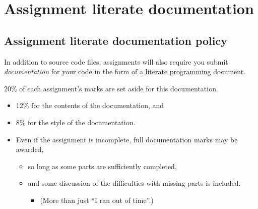 \documentclass[11pt]{article}
\begin{document}
\section{Assignment literate documentation}
\label{sec:orgacc7ec9}
\subsection{Assignment literate documentation policy}
\label{sec:org9ca13e1}
In addition to source code files,
assignments will also require you submit \emph{documentation} for your code
in the form of
a \href{http://www.literateprogramming.com/index.html}{literate programming} document.

20\% of each assignment's marks are set aside for this documentation.
\begin{itemize}
\item 12\% for the contents of the documentation, and
\item 8\% for the style of the documentation.
\item Even if the assignment is incomplete, full documentation marks
may be awarded,
\begin{itemize}
\item so long as some parts are sufficiently completed,
\item and some discussion of the difficulties with missing parts is included.
\begin{itemize}
\item (More than just “I ran out of time”.)
\end{itemize}
\end{itemize}
\end{itemize}
\end{document}
